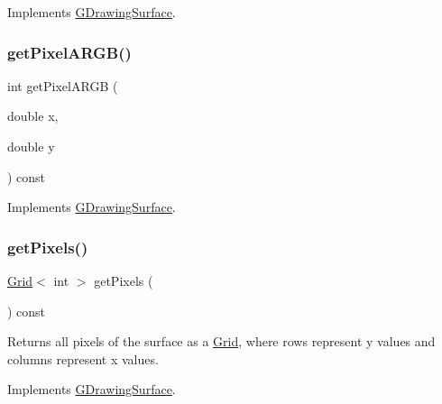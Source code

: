 Implements \mbox{\hyperlink{classGDrawingSurface_a40f3e3f64a8263e13b7162e15b2979ee}{G\+Drawing\+Surface}}.

\mbox{\label{classGForwardDrawingSurface_ac1016456426446714a53d29da622f2ec}} 
\subsubsection{\texorpdfstring{get\+Pixel\+A\+R\+G\+B()}{getPixelARGB()}}
{\footnotesize\ttfamily int get\+Pixel\+A\+R\+GB (\begin{DoxyParamCaption}\item[{double}]{x,  }\item[{double}]{y }\end{DoxyParamCaption}) const\hspace{0.3cm}{\ttfamily [virtual]}}



Implements \mbox{\hyperlink{classGDrawingSurface_aee10de1ca7da1fc3f3fc0e48286f88f8}{G\+Drawing\+Surface}}.

\mbox{\label{classGForwardDrawingSurface_a430b4965720f3b35f10062a252883e75}} 
\subsubsection{\texorpdfstring{get\+Pixels()}{getPixels()}}
{\footnotesize\ttfamily \mbox{\hyperlink{classGrid}{Grid}}$<$ int $>$ get\+Pixels (\begin{DoxyParamCaption}{ }\end{DoxyParamCaption}) const\hspace{0.3cm}{\ttfamily [virtual]}}



Returns all pixels of the surface as a \mbox{\hyperlink{classGrid}{Grid}}, where rows represent y values and columns represent x values. 



Implements \mbox{\hyperlink{classGDrawingSurface_a9811240b1241922153dec17d395797cf}{G\+Drawing\+Surface}}.

